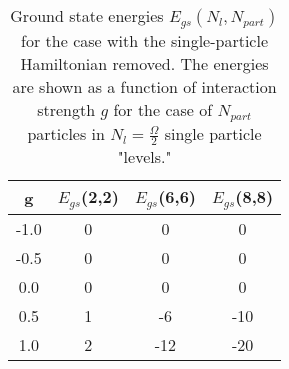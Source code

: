\documentclass[11pt]{article}
\begin{document}
\begin{table}
\begin{center}
\begin{tabular}{|c|c|c|c|}
\hline
   g   &  $E_{gs}$(2,2)  &  $E_{gs}$(6,6)  & $ E_{gs}$(8,8) \\ \hline
-1.0  &  0  &  0  &  0   \\
-0.5  &  0  &  0  &  0   \\
  0.0  &  0  &  0  &  0   \\
  0.5  &  1  & -6  &  -10 \\
  1.0  &  2  & -12 &  -20 \\
\hline
\end{tabular}
\end{center}
\caption{Ground state energies $E_{gs}(N_l,N_{part})$ for the case with
the single-particle Hamiltonian removed. The energies are shown as a
function of interaction strength $g$ for the case of $N_{part}$
particles in $N_l=\frac{\Omega}{2}$ single particle "levels."}
\label{tab:data-nosinglepart}
\end{table}

\end{document}
